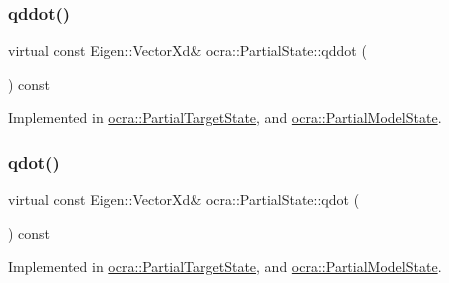 \hypertarget{classocra_1_1PartialState_ad12359c11926c2151dc1459e88b9fedc}{}\label{classocra_1_1PartialState_ad12359c11926c2151dc1459e88b9fedc} 
\subsubsection{\texorpdfstring{qddot()}{qddot()}}
{\footnotesize\ttfamily virtual const Eigen\+::\+Vector\+Xd\& ocra\+::\+Partial\+State\+::qddot (\begin{DoxyParamCaption}{ }\end{DoxyParamCaption}) const\hspace{0.3cm}{\ttfamily [pure virtual]}}



Implemented in \hyperlink{classocra_1_1PartialTargetState_a450c270ee9583ad7cde6a91630045792}{ocra\+::\+Partial\+Target\+State}, and \hyperlink{classocra_1_1PartialModelState_a9be011bf4005c0b964f857a82b2b2b23}{ocra\+::\+Partial\+Model\+State}.

\hypertarget{classocra_1_1PartialState_a5af623db2ae7e68cb4658f226e8ae006}{}\label{classocra_1_1PartialState_a5af623db2ae7e68cb4658f226e8ae006} 
\subsubsection{\texorpdfstring{qdot()}{qdot()}}
{\footnotesize\ttfamily virtual const Eigen\+::\+Vector\+Xd\& ocra\+::\+Partial\+State\+::qdot (\begin{DoxyParamCaption}{ }\end{DoxyParamCaption}) const\hspace{0.3cm}{\ttfamily [pure virtual]}}



Implemented in \hyperlink{classocra_1_1PartialTargetState_a9442a4f1c0827a20b6d6582dcceff88a}{ocra\+::\+Partial\+Target\+State}, and \hyperlink{classocra_1_1PartialModelState_a8707827d456a8c406d95c1cd4fc2e0b7}{ocra\+::\+Partial\+Model\+State}.

\hypertarget{classocra_1_1PartialState_a875575d215c7fe9278d47ff6f392bb84}{}\label{classocra_1_1PartialState_a875575d215c7fe9278d47ff6f392bb84} 
